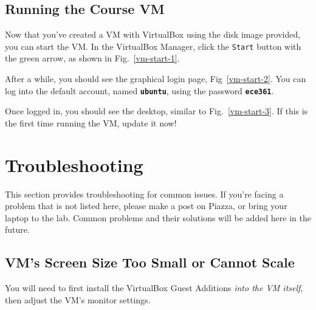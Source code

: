\documentclass[11pt]{article}
\begin{document}
\subsection{Running the Course VM}
\label{subsec:run-vm}
Now that you've created a VM with VirtualBox using the disk image provided, you can start the VM. In the VirtualBox Manager, click the \texttt{Start} button with the green arrow, as shown in Fig.~\ref{vm-start-1}.

After a while, you should see the graphical login page, Fig~\ref{vm-start-2}. You can log into the default account, named \textbf{\texttt{ubuntu}}, using the password \textbf{\texttt{ece361}}.

Once logged in, you should see the desktop, similar to Fig.~\ref{vm-start-3}. If this is the first time running the VM, update it now!


\newpage
\section{Troubleshooting}
\label{sec:troubleshooting}
This section provides troubleshooting for common issues. If you're facing a problem that is not listed here, please make a post on Piazza, or bring your laptop to the lab. Common problems and their solutions will be added here in the future.

\subsection{VM's Screen Size Too Small or Cannot Scale}
You will need to first install the VirtualBox Guest Additions \textit{into the VM itself}, then adjust the VM's monitor settings.
\end{document}
